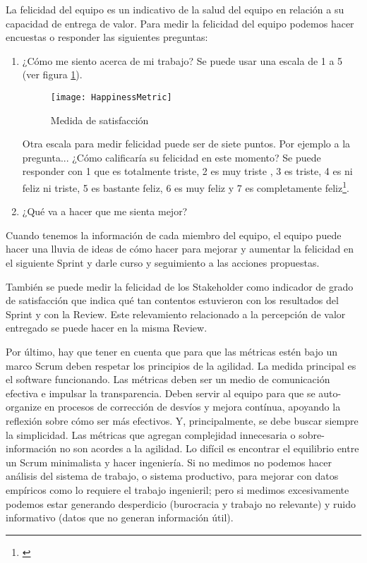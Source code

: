 \begin{enumerate}
{La felicidad del equipo es un indicativo de la salud del equipo en relación a su capacidad de entrega de valor. Para medir la felicidad del equipo podemos hacer encuestas o responder las siguientes preguntas:

  \begin{enumerate}
  \item {¿Cómo me siento acerca de mi trabajo? Se puede usar una escala de 1 a 5 (ver figura \ref{fig:HappinessMetric}). 
  
  \begin{figure}[h]
  \centering
  \texttt{[image: HappinessMetric]}
  \caption{Medida de satisfacción}
  \centering
  \label{fig:HappinessMetric} %
\end{figure}

  Otra escala para medir felicidad puede ser de siete puntos. Por ejemplo a la pregunta... ¿Cómo calificaría su felicidad en este momento? Se puede responder con 1 que es totalmente triste, 2 es muy triste , 3 es triste, 4 es ni feliz ni triste, 5 es bastante feliz, 6 es muy feliz y 7 es completamente feliz\footnote{\cite{U-K-University-2014}}.
  }
  
  \item {¿Qué va a hacer que me sienta mejor?}
  \end{enumerate}

Cuando tenemos la información de cada miembro del equipo, el equipo puede hacer una lluvia de ideas de cómo hacer para mejorar y aumentar la felicidad en el siguiente Sprint y darle curso y seguimiento a las acciones propuestas.

También se puede medir la felicidad de los Stakeholder como indicador de grado de satisfacción que indica qué tan contentos estuvieron con los resultados del Sprint y con la Review. Este relevamiento relacionado a la percepción de valor entregado se puede hacer en la misma Review.

}


\end{enumerate}


Por último, hay que tener en cuenta que para que las métricas estén bajo un marco Scrum deben respetar los principios de la agilidad. La medida principal es el software funcionando. Las métricas deben ser un medio de comunicación efectiva e impulsar la transparencia. Deben servir al equipo para que se auto-organize en procesos de corrección de desvíos y mejora contínua, apoyando la reflexión sobre cómo ser más efectivos. Y, principalmente, se debe buscar siempre la simplicidad. Las métricas que agregan complejidad innecesaria o sobre-información no son acordes a la agilidad. Lo difícil es encontrar el equilibrio entre un Scrum minimalista y hacer ingeniería. Si no medimos no podemos hacer análisis del sistema de trabajo, o sistema productivo, para mejorar con datos empíricos como lo requiere el trabajo ingenieril; pero si medimos excesivamente podemos estar generando desperdicio (burocracia y trabajo no relevante) y ruido informativo (datos que no generan información útil).
